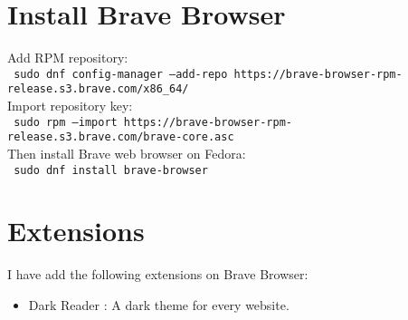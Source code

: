 \documentclass{article}
\newcommand{\shellcmd}[1]{\\\indent\indent\texttt{\footnotesize\ #1}\\}
\begin{document}
\section{Install Brave Browser}
\noindent Add RPM repository:
\shellcmd{sudo dnf config-manager --add-repo https://brave-browser-rpm-release.s3.brave.com/x86\_64/}
\noindent Import repository key:
\shellcmd{sudo rpm --import https://brave-browser-rpm-release.s3.brave.com/brave-core.asc}
\noindent Then install Brave web browser on Fedora:
\shellcmd{sudo dnf install brave-browser}
\section{Extensions}
I have add the following extensions on Brave Browser:
\begin{itemize}
	\item Dark Reader : A dark theme for every website.
\end{itemize}
\end{document}
